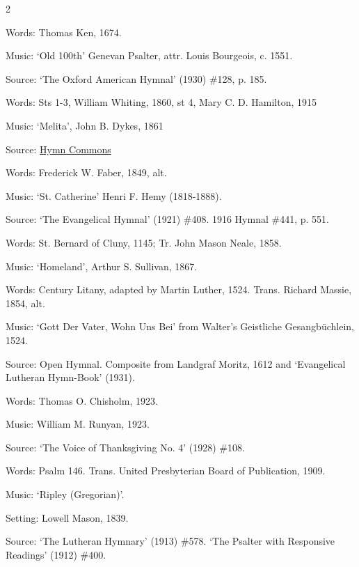 \begin{multicols}{2}
\par\noindent
Words: Thomas Ken, 1674.
\par\noindent
Music: `Old 100th' Genevan Psalter, attr. Louis Bourgeois, c. 1551.
\par\noindent
Source: `The Oxford American Hymnal' (1930) \#128, p. 185.

\newcolumn

\par\noindent
Words: Sts 1-3, William Whiting, 1860, st 4, Mary C. D. Hamilton, 1915
\par\noindent
Music: `Melita', John B. Dykes, 1861
\par\noindent
Source: \href{https://hymncommons.org}{Hymn Commons}


\par\noindent
Words: Frederick W. Faber, 1849, alt.
\par\noindent
Music: `St. Catherine' Henri F. Hemy (1818-1888).
\par\noindent
Source: `The Evangelical Hymnal' (1921) \#408. 1916 Hymnal \#441, p. 551.


\par\noindent
Words: St. Bernard of Cluny, 1145; Tr. John Mason Neale, 1858.
\par\noindent
Music: `Homeland', Arthur S. Sullivan, 1867.


\par\noindent
Words:  Century Litany, adapted by Martin Luther, 1524. Trans. Richard Massie, 1854, alt. 
\par\noindent
Music: `Gott Der Vater, Wohn Uns Bei' from Walter's Geistliche Gesangbüchlein, 1524.
\par\noindent
Source: Open Hymnal. Composite from Landgraf Moritz, 1612 and `Evangelical Lutheran Hymn-Book' (1931).


\par\noindent
Words: Thomas O. Chisholm, 1923.
\par\noindent
Music: William M. Runyan, 1923.
\par\noindent
Source: `The Voice of Thanksgiving No. 4' (1928) \#108.


\par\noindent
Words: Psalm 146. Trans. United Presbyterian Board of Publication, 1909.
\par\noindent
Music: `Ripley (Gregorian)'. 
\par\noindent
Setting: Lowell Mason, 1839.
\par\noindent
Source: `The Lutheran Hymnary' (1913) \#578. `The Psalter with Responsive Readings' (1912) \#400. 



\end{multicols}
